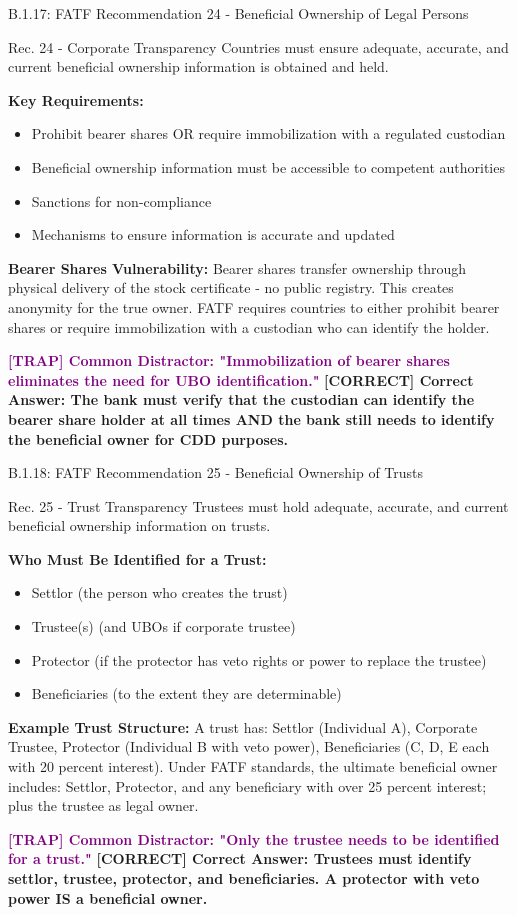 \documentclass[11pt,a4paper]{beamer}
\newcommand{\trap}[1]{\textcolor{purple}{\textbf{[TRAP] #1}}}
\newcommand{\correct}[1]{\textcolor{green!50!black}{\textbf{[CORRECT] #1}}}
\begin{document}
	\begin{frame}{B.1.17: FATF Recommendation 24 - Beneficial Ownership of Legal Persons}
		\begin{block}{Rec. 24 - Corporate Transparency}
			Countries must ensure adequate, accurate, and current beneficial ownership information is obtained and held.
		\end{block}
		\textbf{Key Requirements:}
		\begin{itemize}
			\item Prohibit bearer shares OR require immobilization with a regulated custodian
			\item Beneficial ownership information must be accessible to competent authorities
			\item Sanctions for non-compliance
			\item Mechanisms to ensure information is accurate and updated
		\end{itemize}
		\textbf{Bearer Shares Vulnerability:}
		Bearer shares transfer ownership through physical delivery of the stock certificate - no public registry. This creates anonymity for the true owner. FATF requires countries to either prohibit bearer shares or require immobilization with a custodian who can identify the holder.
		
		\trap{Common Distractor: "Immobilization of bearer shares eliminates the need for UBO identification."}
		\correct{Correct Answer: The bank must verify that the custodian can identify the bearer share holder at all times AND the bank still needs to identify the beneficial owner for CDD purposes.}
	\end{frame}
	
	\begin{frame}{B.1.18: FATF Recommendation 25 - Beneficial Ownership of Trusts}
		\begin{block}{Rec. 25 - Trust Transparency}
			Trustees must hold adequate, accurate, and current beneficial ownership information on trusts.
		\end{block}
		\textbf{Who Must Be Identified for a Trust:}
		\begin{itemize}
			\item Settlor (the person who creates the trust)
			\item Trustee(s) (and UBOs if corporate trustee)
			\item Protector (if the protector has veto rights or power to replace the trustee)
			\item Beneficiaries (to the extent they are determinable)
		\end{itemize}
		\textbf{Example Trust Structure:}
		A trust has: Settlor (Individual A), Corporate Trustee, Protector (Individual B with veto power), Beneficiaries (C, D, E each with 20 percent interest).
		Under FATF standards, the ultimate beneficial owner includes: Settlor, Protector, and any beneficiary with over 25 percent interest; plus the trustee as legal owner.
		
		\trap{Common Distractor: "Only the trustee needs to be identified for a trust."}
		\correct{Correct Answer: Trustees must identify settlor, trustee, protector, and beneficiaries. A protector with veto power IS a beneficial owner.}
	\end{frame}
	
\end{document}
